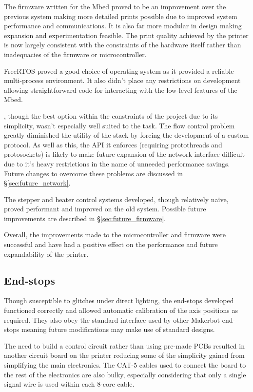 			The firmware written for the Mbed proved to be an improvement over the
			previous system making more detailed prints possible due to improved
			system performance and communications. It is also far more modular in
			design making expansion and experimentation feasible. The print quality
			achieved by the printer is now largely consistent with the constraints of
			the hardware itself rather than inadequacies of the firmware or
			microcontroller.
			
			FreeRTOS proved a good choice of operating system as it provided a
			reliable multi-process environment. It also didn't place any restrictions
			on development allowing straightforward code for interacting with the
			low-level features of the Mbed.
			
			\uIP{}, though the best option within the constraints of the project due
			to its simplicity, wasn't especially well suited to the task. The flow
			control problem greatly diminished the utility of the stack by forcing the
			development of a custom protocol. As well as this, the API it enforces
			(requiring protothreads and protosockets) is likely to make future
			expansion of the network interface difficult due to it's heavy
			restrictions in the name of unneeded performance savings. Future changes
			to overcome these problems are discussed in \S\ref{sec:future_network}.
			
			The stepper and heater control systems developed, though relatively
			na\"ive, proved performant and improved on the old system. Possible future
			improvements are described in \S\ref{sec:future_firmware}.
			
			Overall, the improvements made to the microcontroller and firmware were
			successful and have had a positive effect on the performance and future
			expandability of the printer.
		
		\subsection{End-stops}
			
			Though susceptible to glitches under direct lighting, the end-stops developed
			functioned correctly and allowed automatic calibration of the axis
			positions as required. They also obey the standard interface used by other
			Makerbot end-stops meaning future modifications may make use of standard
			designs.
			
			The need to build a control circuit rather than using pre-made PCBs
			resulted in another circuit board on the printer reducing some of the
			simplicity gained from simplifying the main electronics. The CAT-5 cables
			used to connect the board to the rest of the electronics are also bulky,
			especially considering that only a single signal wire is used within each
			8-core cable.
			
